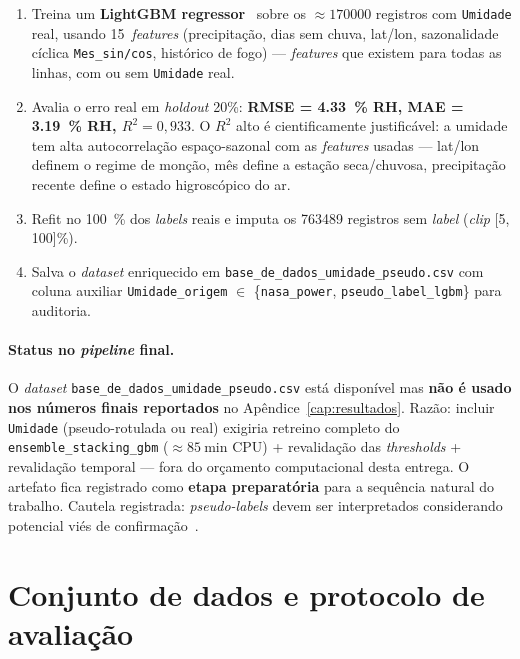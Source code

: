 \begin{enumerate}
  \item Treina um \textbf{LightGBM regressor}~\cite{ke2017lightgbm} sobre os \(\approx \num{170000}\) registros com \texttt{Umidade} real, usando 15~\emph{features} (precipitação, dias sem chuva, lat/lon, sazonalidade cíclica \texttt{Mes\_sin/cos}, histórico de fogo) --- \emph{features} que existem para todas as linhas, com ou sem \texttt{Umidade} real.

  \item Avalia o erro real em \emph{holdout} 20\%: \textbf{RMSE = \SI{4,33}{\percent} RH, MAE = \SI{3,19}{\percent} RH, \(R^2 = 0{,}933\)}. O \(R^2\) alto é cientificamente justificável: a umidade tem alta autocorrelação espaço-sazonal com as \emph{features} usadas --- lat/lon definem o regime de monção, mês define a estação seca/chuvosa, precipitação recente define o estado higroscópico do ar.

  \item Refit no \SI{100}{\percent} dos \emph{labels} reais e imputa os \num{763489} registros sem \emph{label} (\emph{clip} [5, 100]\%).

  \item Salva o \emph{dataset} enriquecido em \texttt{base\_de\_dados\_umidade\_pseudo.csv} com coluna auxiliar \texttt{Umidade\_origem} \(\in\) \{\texttt{nasa\_power}, \texttt{pseudo\_label\_lgbm}\} para auditoria.
\end{enumerate}

\paragraph{Status no \emph{pipeline} final.} O \emph{dataset} \texttt{base\_de\_dados\_umidade\_pseudo.csv} está disponível mas \textbf{não é usado nos números finais reportados} no Apêndice~\ref{cap:resultados}. Razão: incluir \texttt{Umidade} (pseudo-rotulada ou real) exigiria retreino completo do \texttt{ensemble\_stacking\_gbm} (\(\approx \SI{85}{\minute}\) CPU) + revalidação das \emph{thresholds} + revalidação temporal --- fora do orçamento computacional desta entrega. O artefato fica registrado como \textbf{etapa preparatória} para a sequência natural do trabalho. Cautela registrada: \emph{pseudo-labels} devem ser interpretados considerando potencial viés de confirmação~\cite{arazo2020pseudo}.

\section{Conjunto de dados e protocolo de avaliação}
\label{sec:res_dataset}

